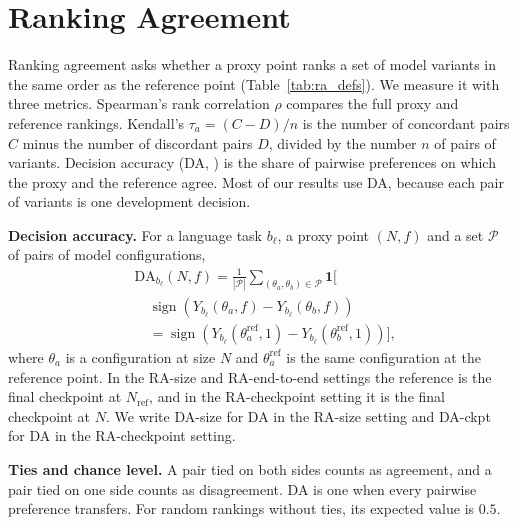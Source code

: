 \clearpage

\section{Ranking Agreement}
\label{app:ranking-agreement}

Ranking agreement asks whether a proxy point ranks a set of model variants in the same order as the reference point (Table~\ref{tab:ra_defs}). We measure it with three metrics. Spearman's rank correlation $\rho$ compares the full proxy and reference rankings.
Kendall's $\tau_a = (C-D)/n$ is the number of concordant pairs $C$ minus the number of discordant pairs $D$, divided by the number $n$ of pairs of variants.
Decision accuracy (DA, \citealp{heineman_signal_2025}) is the share of pairwise preferences on which the proxy and the reference agree. Most of our results use DA, because each pair of variants is one development decision.

\textbf{Decision accuracy.} For a language task $b_\ell$, a proxy point $(N,f)$ and a set $\mathcal{P}$ of pairs of model configurations,
\begin{equation}
\begin{aligned}
&\mathrm{DA}_{b_\ell}(N,f)
=
\frac{1}{|\mathcal{P}|}
\sum_{(\theta_a,\theta_b)\in\mathcal{P}}
\mathbf{1}
\Big[ \\
&\quad\operatorname{sign}\!\left(Y_{b_\ell}(\theta_a,f)-Y_{b_\ell}(\theta_b,f)\right) \\
&\quad=
\operatorname{sign}\!\left(Y_{b_\ell}(\theta_a^{\mathrm{ref}},1)-Y_{b_\ell}(\theta_b^{\mathrm{ref}},1)\right)
\Big],
\end{aligned}
\label{eq:decision-accuracy}
\end{equation}
where $\theta_a$ is a configuration at size $N$ and $\theta_a^{\mathrm{ref}}$ is the same configuration at the reference point. In the RA-size and RA-end-to-end settings the reference is the final checkpoint at $N_{\mathrm{ref}}$, and in the RA-checkpoint setting it is the final checkpoint at $N$. We write DA-size for DA in the RA-size setting and DA-ckpt for DA in the RA-checkpoint setting.

\textbf{Ties and chance level.} A pair tied on both sides counts as agreement, and a pair tied on one side counts as disagreement. DA is one when every pairwise preference transfers. For random rankings without ties, its expected value is $0.5$.


